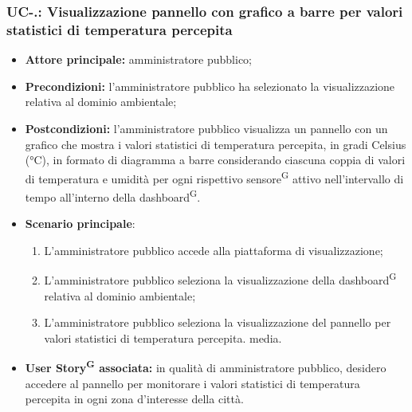 \documentclass[8pt]{article}
\newcommand{\glossterm}[1]{#1\textsuperscript{G}} %
\begin{document}
\subsubsection*{UC-\theuc .\speconenumber: Visualizzazione pannello con grafico a barre per valori statistici di temperatura percepita}
\begin{itemize}
    \item \textbf{Attore principale:} amministratore pubblico;
    \item \textbf{Precondizioni: }l'amministratore pubblico ha selezionato la visualizzazione
        relativa al dominio ambientale;
    \item \textbf{Postcondizioni:} l'amministratore pubblico visualizza un pannello con un grafico che mostra i valori statistici di temperatura percepita, in gradi Celsius (°C), in formato di diagramma a barre considerando ciascuna coppia di valori di temperatura e umidità per ogni rispettivo \glossterm{sensore} attivo nell'intervallo di tempo all'interno della \glossterm{dashboard}.
    \item \textbf{Scenario principale}:
    \begin{enumerate}
    \item L'amministratore pubblico accede alla piattaforma di visualizzazione;
    \item L'amministratore pubblico seleziona la visualizzazione della \glossterm{dashboard} relativa al dominio
        ambientale; 
    \item L'amministratore pubblico seleziona la visualizzazione del pannello per valori statistici di temperatura percepita.
        media.
    \end{enumerate}
\item \textbf{\glossterm{User Story} associata:} in qualità di amministratore pubblico, desidero accedere al pannello per monitorare i valori statistici di temperatura percepita in ogni zona d'interesse della città.
\end{itemize}
\end{document}
